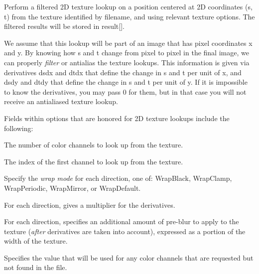Perform a filtered 2D texture lookup on a position centered at 2D
coordinates ({\cf s}, {\cf t}) from the texture identified by
{\cf filename}, and using relevant texture {\cf options}.  The filtered
results will be stored in {\cf result[]}.

We assume that this lookup will be part of an image that has pixel
coordinates {\cf x} and {\cf y}.  By knowing how {\cf s} and {\cf t}
change from pixel to pixel in the final image, we can properly
\emph{filter} or antialias the texture lookups.  This information is
given via derivatives {\cf dsdx} and {\cf dtdx} that define the change
in {\cf s} and {\cf t} per unit of {\cf x}, and {\cf dsdy} and {\cf
  dtdy} that define the change in {\cf s} and {\cf t} per unit of {\cf
  y}.  If it is impossible to know the derivatives, you may pass 0 for
them, but in that case you will not receive an antialiased texture lookup.

Fields within {\cf options} that are honored for 2D texture lookups
include the following:

\vspace{-12pt}
\vspace{10pt}
The number of color channels to look up from the texture.
\apiend

\vspace{-24pt}
\vspace{10pt}
The index of the first channel to look up from the texture.
\apiend

\vspace{-24pt}
\vspace{10pt}
Specify the \emph{wrap mode} for each direction, one of: 
{\cf WrapBlack}, {\cf WrapClamp}, {\cf WrapPeriodic}, {\cf WrapMirror},
or {\cf WrapDefault}.
\apiend

\vspace{-24pt}
\vspace{10pt}
For each direction, gives a multiplier for the derivatives.
\apiend

\vspace{-24pt}
\vspace{10pt}
For each direction, specifies an additional amount of pre-blur to apply
to the texture (\emph{after} derivatives are taken into account),
expressed as a portion of the width of the texture.
\apiend

\vspace{-24pt}
\vspace{10pt}
Specifies the value that will be used for any color channels that are
requested but not found in the file.
\apiend

